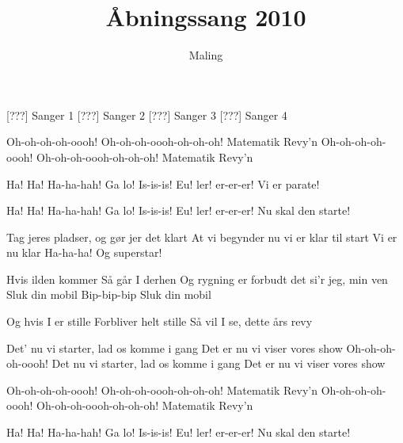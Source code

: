 \documentclass[a4paper,11pt]{article}
\title{Åbningssang 2010}
\author{Maling}
\begin{document}
\maketitle

\begin{roles}
[???] Sanger 1
[???] Sanger 2
[???] Sanger 3
[???] Sanger 4
\end{roles}

\begin{song}
\scene{}
 Oh-oh-oh-oh-oooh! Oh-oh-oh-oooh-oh-oh-oh!
 Matematik Revy'n
 Oh-oh-oh-oh-oooh! Oh-oh-oh-oooh-oh-oh-oh!
 Matematik Revy'n

 Ha! Ha! Ha-ha-hah! Ga lo! Is-is-is! Eu! ler! er-er-er!
 Vi er parate!

 Ha! Ha! Ha-ha-hah! Ga lo! Is-is-is! Eu! ler! er-er-er!
 Nu skal den starte!

 Tag jeres pladser,
og gør jer det klart
At vi begynder nu
vi er klar til start
 Vi er nu klar
 Ha-ha-ha!
 Og superstar!

 Hvis ilden kommer
Så går I derhen
Og rygning er forbudt
det si'r jeg, min ven
 Sluk din mobil
 Bip-bip-bip
 Sluk din mobil

 Og hvis I er stille
Forbliver helt stille
Så vil I se, dette års revy

 Det' nu vi starter, lad os komme i gang
Det er nu vi viser vores show
Oh-oh-oh-oh-oooh!
Det nu vi starter, lad os komme i gang
Det er nu vi viser vores show

Oh-oh-oh-oh-oooh! Oh-oh-oh-oooh-oh-oh-oh!
Matematik Revy'n
Oh-oh-oh-oh-oooh! Oh-oh-oh-oooh-oh-oh-oh!
Matematik Revy'n

Ha! Ha! Ha-ha-hah! Ga lo! Is-is-is! Eu! ler! er-er-er! Nu skal den starte!
\end{song}
\end{document}
